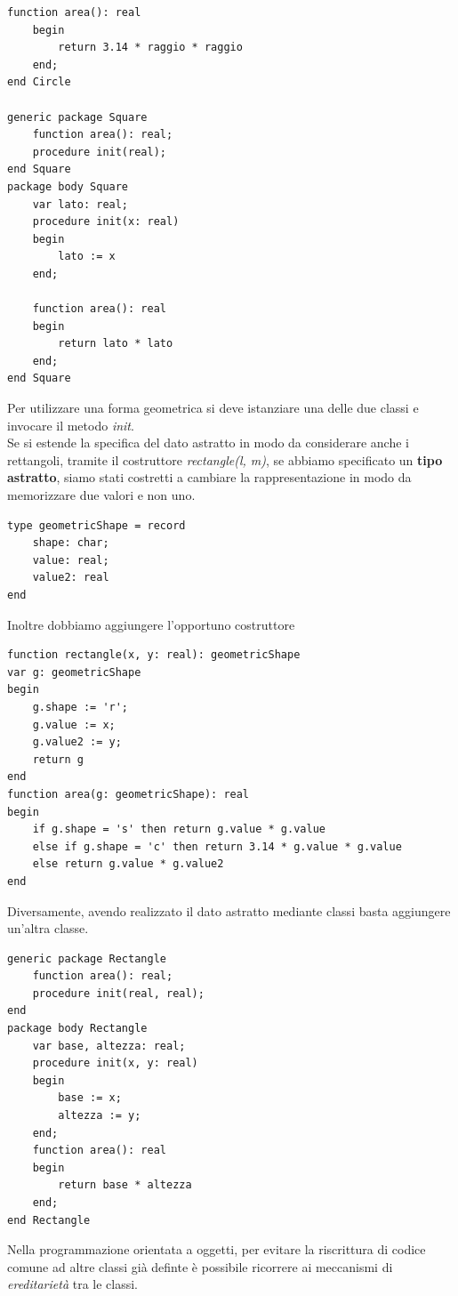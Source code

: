 \documentclass[12pt]{report}
\begin{document}
\begin{itemize}
\begin{example}{}{}
\begin{lstlisting}[style=adastyle]
	function area(): real
	begin
		return 3.14 * raggio * raggio
	end;
end Circle

generic package Square
	function area(): real;
	procedure init(real);
end Square
package body Square
	var lato: real;
	procedure init(x: real)
	begin
		lato := x
	end;

	function area(): real
	begin
		return lato * lato
	end;
end Square\end{lstlisting}
					Per utilizzare una forma geometrica si deve istanziare una delle due classi e invocare il metodo \textit{init}. \\
					Se si estende la specifica del dato astratto in modo da considerare anche i rettangoli, tramite il costruttore \textit{rectangle(l, m)}, se abbiamo specificato un \textbf{tipo astratto}, siamo stati costretti a cambiare la rappresentazione in modo da memorizzare due valori e non uno.
					\begin{lstlisting}[style=adastyle]
type geometricShape = record
	shape: char;
	value: real;
	value2: real
end\end{lstlisting}
				Inoltre dobbiamo aggiungere l'opportuno costruttore
\begin{lstlisting}[style=adastyle]
function rectangle(x, y: real): geometricShape
var g: geometricShape
begin
	g.shape := 'r';
	g.value := x;
	g.value2 := y;
	return g
end
function area(g: geometricShape): real
begin
	if g.shape = 's' then return g.value * g.value
	else if g.shape = 'c' then return 3.14 * g.value * g.value
	else return g.value * g.value2
end\end{lstlisting}
				Diversamente, avendo realizzato il dato astratto mediante classi basta aggiungere un'altra classe.
\begin{lstlisting}[style=adastyle]
generic package Rectangle
	function area(): real;
	procedure init(real, real);
end
package body Rectangle
	var base, altezza: real;
	procedure init(x, y: real)
	begin
		base := x;
		altezza := y;
	end;
	function area(): real
	begin
		return base * altezza
	end;
end Rectangle\end{lstlisting}
Nella programmazione orientata a oggetti, per evitare la riscrittura di codice comune ad altre classi già definte è possibile ricorrere ai meccanismi di \textit{ereditarietà} tra le classi.
\end{example}
\end{itemize}
\end{document}
